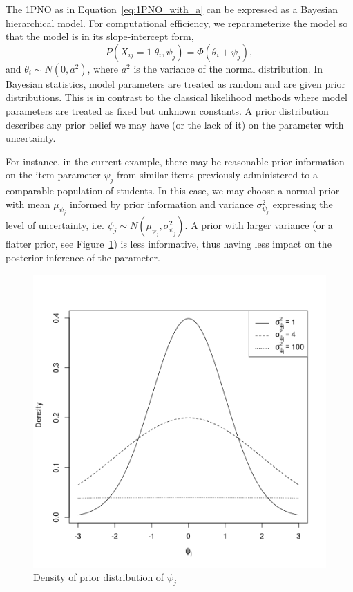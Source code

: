 \documentclass[floatsintext, man]{apa7}
\begin{document}
The 1PNO as in Equation~\ref{eq:1PNO_with_a} can be expressed as a Bayesian
hierarchical model. For computational efficiency, we reparameterize the model so
that the model is in its slope-intercept form,
\begin{equation}
  \label{eq:1PNO}
  P(X_{ij} = 1 | \theta_i, \psi_j) = \Phi(\theta_i + \psi_j),
\end{equation}
and $\theta_i \sim N(0, a^2)$, where $a^2$ is the variance of the normal
distribution. In Bayesian statistics, model parameters are treated as random and
are given prior distributions. This is in contrast to the classical likelihood
methods where model parameters are treated as fixed but unknown constants. A
prior distribution describes any prior belief we may have (or the lack of it) on
the parameter with uncertainty.

For instance, in the current example, there may be reasonable prior information
on the item parameter $\psi_j$ from similar items previously administered to a
comparable population of students. In this case, we may choose a normal prior
with mean $\mu_{\psi_j}$ informed by prior information and variance $\sigma_
{\psi_j}^2$ expressing the level of
uncertainty, i.e. $\psi_j \sim N(\mu_{\psi_j}, \sigma_{\psi_j}^2)$. A prior with
larger variance (or a flatter prior, see Figure~\ref{fig:prior_density}) is
less informative, thus having less impact on the posterior inference of
the parameter. 
\begin{figure}[t]
\centering
  \includegraphics[scale = 0.5]{Fig/prior_normal.png}
  \caption{Density of prior distribution of $\psi_j$}
  \label{fig:prior_density}
\end{figure}
\end{document}
